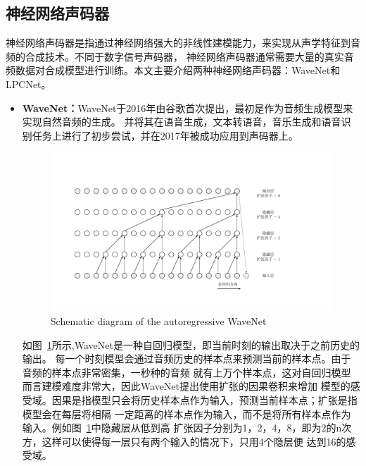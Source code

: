 \subsection{神经网络声码器}
神经网络声码器是指通过神经网络强大的非线性建模能力，来实现从声学特征到音频的合成技术。不同于数字信号声码器，
神经网络声码器通常需要大量的真实音频数据对合成模型进行训练。本文主要介绍两种神经网络声码器：WaveNet和LPCNet。

\begin{itemize}
    \item \textbf{WaveNet：}WaveNet于2016年由谷歌首次提出，最初是作为音频生成模型来实现自然音频的生成\cite{oord2016wavenet}。
    并将其在语音生成，文本转语音，音乐生成和语音识别任务上进行了初步尝试，并在2017年被成功应用到声码器上\cite{tamamori2017speaker}。
    
    \begin{figure}[!htp]
        \centering
        \includegraphics[width=13cm,trim=30 50 130 80,clip]{figure/2_wavenet.pdf}
        {Schematic diagram of the autoregressive WaveNet}
        \label{fig:wavenet}
    \end{figure}

    如图~\ref{fig:wavenet}所示,WaveNet是一种自回归模型，即当前时刻的输出取决于之前历史的输出。
    每一个时刻模型会通过音频历史的样本点来预测当前的样本点。由于音频的样本点非常密集，一秒种的音频
    就有上万个样本点，这对自回归模型而言建模难度非常大，因此WaveNet提出使用扩张的因果卷积来增加
    模型的感受域。因果是指模型只会将历史样本点作为输入，预测当前样本点；扩张是指模型会在每层将相隔
    一定距离的样本点作为输入，而不是将所有样本点作为输入。例如图~\ref{fig:wavenet}中隐藏层从低到高
    扩张因子分别为1，2，4，8，即为2的n次方，这样可以使得每一层只有两个输入的情况下，只用4个隐层便
    达到16的感受域。


\end{itemize}
